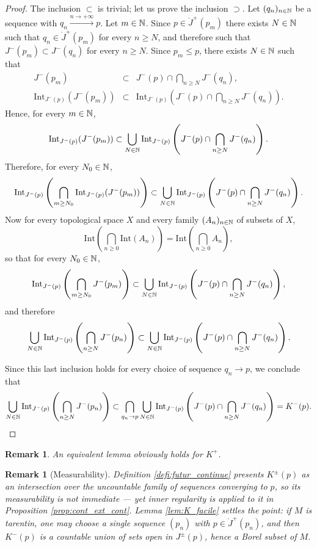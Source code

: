 \documentclass[a4paper,twoside]{article}
\newtheorem{rem}[lem]{Remark}
\begin{document}
\begin{proof}
The inclusion $\subset$ is trivial; let us prove the inclusion $\supset$. Let $(q_n)_{n\in \mathbb{N}}$ be a sequence with
$q_n \xrightarrow{n\rightarrow +\infty} p$.
Let $m\in \mathbb{N}$. Since $p\in \ring J^+(p_m)$ there exists $N\in \mathbb{N}$ such that $q_n \in \ring J^+(p_m)$ for every $n\geq N$, and therefore such that
$J^-(p_m)\subset J^-(q_n)$ for every $n\geq N$.
Since $p_m\leq p$, there exists $N\in \mathbb{N}$ such that
\begin{eqnarray*} J^-(p_m) &\subset& J^-(p)\cap \bigcap_{n\geq N} J^-(q_n), \\
\mathrm{Int}_{J^-(p)}( J^-(p_m)) &\subset&  \mathrm{Int}_{J^-(p)}\left( J^-(p)\cap \bigcap_{n\geq N} J^-(q_n) \right).
\end{eqnarray*}
Hence, for every $m\in \mathbb{N}$,
$$  \mathrm{Int}_{J^-(p)}( J^-(p_m)) \subset \bigcup_{N\in \mathbb{N}}
\mathrm{Int}_{J^-(p)}\left( J^-(p)\cap \bigcap_{n\geq N} J^-(q_n) \right).$$
Therefore, for every $N_0\in \mathbb{N}$,
$$\mathrm{Int}_{J^-(p)}\left( \bigcap_{m\geq N_0} \mathrm{Int}_{J^-(p)}( J^-(p_m))\right) \subset \bigcup_{N\in \mathbb{N}} \mathrm{Int}_{J^-(p)}\left( J^-(p)\cap \bigcap_{n\geq N} J^-(q_n) \right).$$
Now for every topological space $X$ and every family $(A_n)_{n\in \mathbb{N}}$ of subsets of $X$,
$$\mathrm{Int} \left( \bigcap_{n\geq 0} \mathrm{Int}(A_n)\right) = \mathrm{Int}\left( \bigcap_{n\geq 0} A_n\right),$$
so that for every $N_0\in \mathbb{N}$,
$$\mathrm{Int}_{J^-(p)}\left( \bigcap_{m\geq N_0}  J^-(p_m)\right) \subset \bigcup_{N\in \mathbb{N}} \mathrm{Int}_{J^-(p)}\left( J^-(p)\cap \bigcap_{n\geq N} J^-(q_n) \right),$$
and therefore
$$\bigcup_{N\in \mathbb{N}}\mathrm{Int}_{J^-(p)}\left( \bigcap_{n\geq N}  J^-(p_n)\right) \subset \bigcup_{N\in \mathbb{N}} \mathrm{Int}_{J^-(p)}\left( J^-(p)\cap \bigcap_{n\geq N} J^-(q_n) \right).$$

Since this last inclusion holds for every choice of sequence $q_n\rightarrow p$, we conclude that
$$\bigcup_{N\in \mathbb{N}}\mathrm{Int}_{J^-(p)}\left( \bigcap_{n\geq N}  J^-(p_n)\right) \subset \bigcap_{q_n\rightarrow p} \bigcup_{N\in \mathbb{N}} \mathrm{Int}_{J^-(p)}\left( J^-(p)\cap \bigcap_{n\geq N} J^-(q_n) \right)=K^-(p).$$
\end{proof}
\begin{rem} An equivalent lemma obviously holds for $K^+$.
\end{rem}
\begin{rem}[Measurability]\label{rem:K_borelien}
Definition \ref{defi:futur_continue} presents $K^\pm(p)$ as an intersection over the \emph{uncountable}
family of sequences converging to $p$, so its measurability is not immediate --- yet inner regularity
is applied to it in Proposition \ref{prop:cont_ext_cont}. Lemma \ref{lem:K_facile} settles the point:
if $M$ is tarentin, one may choose a single sequence $(p_n)$ with $p\in \ring J^+(p_n)$, and then
$K^-(p)$ is a countable union of sets open in $J^\pm(p)$, hence a Borel subset of $M$.
\end{rem}
\end{document}
